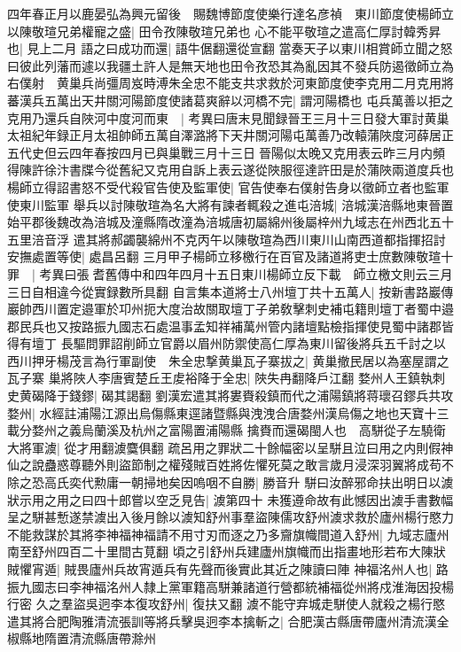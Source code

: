 四年春正月以鹿晏弘為興元留後　賜魏博節度使樂行達名彦禎　東川節度使楊師立以陳敬瑄兄弟權寵之盛|{
	田令孜陳敬瑄兄弟也}
心不能平敬瑄之遣高仁厚討韓秀昇也|{
	見上二月}
語之曰成功而還|{
	語牛倨翻還從宣翻}
當奏天子以東川相賞師立聞之怒曰彼此列藩而遽以我疆土許人是無天地也田令孜恐其為亂因其不發兵防遏徵師立為右僕射　黄巢兵尚彊周岌時溥朱全忠不能支共求救於河東節度使李克用二月克用將蕃漢兵五萬出天井關河陽節度使諸葛爽辭以河橋不完|{
	謂河陽橋也}
屯兵萬善以拒之克用乃還兵自陜河中度河而東　|{
	考異曰唐末見聞録晉王三月十三日發大軍討黄巢太祖紀年録正月太祖帥師五萬自澤潞將下天井關河陽屯萬善乃改轅蒲陜度河薛居正五代史但云四年春按四月已與巢戰三月十三日晉陽似太晚又克用表云昨三月内頻得陳許徐汴書牒今從舊紀又克用自訴上表云遂從陜服徑達許田是於蒲陜兩道度兵也}
楊師立得詔書怒不受代殺官告使及監軍使|{
	官告使奉右僕射告身以徵師立者也監軍使東川監軍}
舉兵以討陳敬瑄為名大將有諫者輒殺之進屯涪城|{
	涪城漢涪縣地東晉置始平郡後魏改為涪城及潼縣隋改潼為涪城唐初屬綿州後屬梓州九域志在州西北五十五里涪音浮}
遣其將郝蠲襲綿州不克丙午以陳敬瑄為西川東川山南西道都指揮招討安撫處置等使|{
	處昌呂翻}
三月甲子楊師立移檄行在百官及諸道將吏士庶數陳敬瑄十罪　|{
	考異曰張耆舊傳中和四年四月十五日東川楊師立反下載　師立檄文則云三月三日自相違今從實録數所具翻}
自言集本道將士八州壇丁共十五萬人|{
	按新書路巖傳巖帥西川置定邉軍於卭州扼大度治故關取壇丁子弟敎擊刺史補屯籍則壇丁者蜀中邉郡民兵也又按路振九國志石處温事孟知祥補萬州管内諸壇點檢指揮使見蜀中諸郡皆得有壇丁}
長驅問罪詔削師立官爵以眉州防禦使高仁厚為東川留後將兵五千討之以西川押牙楊茂言為行軍副使　朱全忠撃黄巢瓦子寨拔之|{
	黄巢撤民居以為塞屋謂之瓦子寨}
巢將陜人李唐賓楚丘王䖍裕降于全忠|{
	陜失冉翻降戶江翻}
婺州人王鎮執刺史黄碣降于錢鏐|{
	碣其謁翻}
劉漢宏遣其將婁賚殺鎮而代之浦陽鎮將蒋瓌召鏐兵共攻婺州|{
	水經註浦陽江源出烏傷縣東逕諸暨縣與洩洩合唐婺州漢烏傷之地也天寶十三載分婺州之義烏蘭溪及杭州之富陽置浦陽縣}
擒賚而還碣閩人也　高駢從子左驍衛大將軍澞|{
	從才用翻澞麌俱翻}
疏呂用之罪狀二十餘幅密以呈駢且泣曰用之内則假神仙之說蠱惑尊聽外則盜節制之權殘賊百姓將佐懼死莫之敢言歲月浸深羽翼將成苟不除之恐高氏奕代勲庸一朝掃地矣因嗚咽不自勝|{
	勝音升}
駢曰汝醉邪命扶出明日以澞狀示用之用之曰四十郎嘗以空乏見告|{
	澞第四十}
未獲遵命故有此憾因出澞手書數幅呈之駢甚慙遂禁澞出入後月餘以澞知舒州事羣盜陳儒攻舒州澞求救於廬州楊行愍力不能救謀於其將李神福神福請不用寸刃而逐之乃多齎旗幟間道入舒州|{
	九域志廬州南至舒州四百二十里間古莧翻}
頃之引舒州兵建廬州旗幟而出指畫地形若布大陳狀賊懼宵遁|{
	賊畏廬州兵故宵遁兵有先聲而後實此其近之陳讀曰陣}
神福洺州人也|{
	路振九國志曰李神福洺州人隸上黨軍籍高駢兼諸道行營都統補福從州將戍淮海因投楊行密}
久之羣盜吳迥李本復攻舒州|{
	復扶又翻}
澞不能守弃城走駢使人就殺之楊行愍遣其將合肥陶雅清流張訓等將兵擊吳迥李本擒斬之|{
	合肥漢古縣唐帶廬州清流漢全椒縣地隋置清流縣唐帶滁州}
